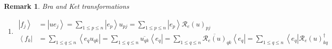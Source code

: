 \documentclass[aps,preprint]{revtex4}%
\newtheorem{remark}[theorem]{Remark}
\begin{document}
\begin{remark}
Bra and Ket transformations

\begin{enumerate}
\item
\begin{align}
\left\vert f_{j}\right\rangle  &  =\left\vert ue_{j}\right\rangle =\sum_{1\leq
p\leq n}\left\vert e_{p}\right\rangle u_{pj}=\sum_{1\leq p\leq n}\left\vert
e_{p}\right\rangle \mathcal{R}_{e}\left(  u\right)  _{pj}\\
\left\langle f_{k}\right\vert  &  =\sum_{1\leq q\leq n}\left\langle
e_{q}u_{qk}\right\vert =\sum_{1\leq q\leq n}\overline{u_{qk}}\left\langle
e_{q}\right\vert =\sum_{1\leq q\leq n}\overline{\mathcal{R}_{e}\left(
u\right)  }_{qk}\left\langle e_{q}\right\vert =\sum_{1\leq q\leq
n}\left\langle e_{q}\right\vert \mathcal{R}_{e}\left(  u\right)
_{kq}^{\dagger}%
\end{align}



\end{enumerate}
\end{remark}
\end{document}
